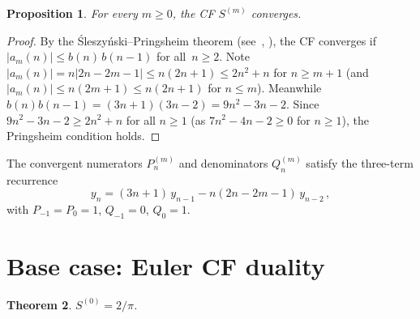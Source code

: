 \documentclass[11pt]{article}
\newtheorem{theorem}{Theorem}[section]
\newtheorem{proposition}[theorem]{Proposition}
\theoremstyle{definition}
\theoremstyle{remark}
\begin{document}
\begin{proposition}\label{prop:conv}
For every $m \geq 0$, the CF $S^{(m)}$ converges.
\end{proposition}

\begin{proof}
By the \'Sleszy\'nski--Pringsheim theorem
(see~\cite[Ch.~III]{wall1948analytic},
\cite[\S4.2]{lorentzen2008continued}), the CF converges if
$|a_m(n)| \leq b(n)\,b(n{-}1)$ for all~$n \geq 2$.
Note $|a_m(n)| = n|2n{-}2m{-}1| \leq n(2n{+}1) \leq 2n^2{+}n$
for $n \geq m{+}1$ (and $|a_m(n)| \leq n(2m{+}1) \leq n(2n{+}1)$
for $n \leq m$).
Meanwhile $b(n)b(n{-}1) = (3n{+}1)(3n{-}2) = 9n^2{-}3n{-}2$.
Since $9n^2{-}3n{-}2 \geq 2n^2{+}n$ for all $n \geq 1$
(as $7n^2{-}4n{-}2 \geq 0$ for $n \geq 1$),
the Pringsheim condition holds.
\end{proof}

The convergent numerators $P_n^{(m)}$ and denominators $Q_n^{(m)}$
satisfy the three-term recurrence
\begin{equation}\label{eq:rec}
  y_n = (3n{+}1)\,y_{n-1} - n(2n{-}2m{-}1)\,y_{n-2}\,,
\end{equation}
with $P_{-1}=P_0=1$, $Q_{-1}=0$, $Q_0=1$.


\section{Base case: Euler CF duality}\label{sec:euler}

\begin{theorem}\label{thm:euler}
$S^{(0)} = 2/\pi$.
\end{theorem}
\end{document}
